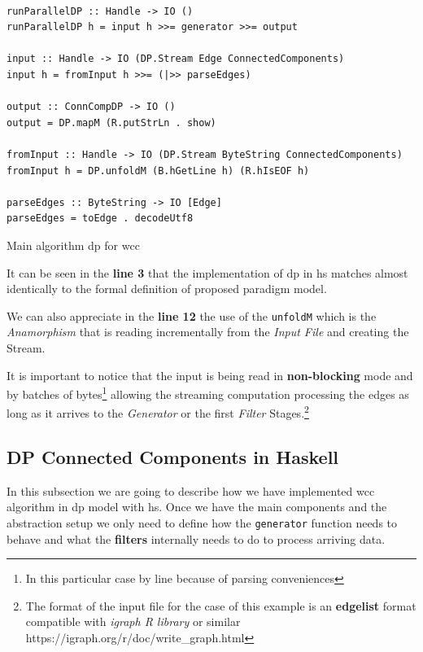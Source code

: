 \documentclass[preprint]{elsarticle}
\begin{document}
\begin{listing}[H]
\begin{verbatim}

runParallelDP :: Handle -> IO ()
runParallelDP h = input h >>= generator >>= output

input :: Handle -> IO (DP.Stream Edge ConnectedComponents)
input h = fromInput h >>= (|>> parseEdges)

output :: ConnCompDP -> IO ()
output = DP.mapM (R.putStrLn . show)

fromInput :: Handle -> IO (DP.Stream ByteString ConnectedComponents)
fromInput h = DP.unfoldM (B.hGetLine h) (R.hIsEOF h)

parseEdges :: ByteString -> IO [Edge]
parseEdges = toEdge . decodeUtf8

\end{verbatim}
\caption{Main algorithm \acrshort{dp} for \acrshort{wcc}}
\label{src:haskell:1}
\end{listing}

It can be seen in the \textbf{line 3} that the implementation of \acrshort{dp} in \acrshort{hs} matches almost identically to the formal definition of proposed paradigm model.

We can also appreciate in the \textbf{line 12} the use of the \texttt{unfoldM} which is the \emph{Anamorphism} that is reading incrementally from the \emph{Input File} and creating the Stream.

It is important to notice that the input is being read in \textbf{non-blocking} mode and by batches of bytes\footnote{In this particular case by line because of parsing conveniences} allowing the streaming computation processing the edges as long as it arrives to the \textit{Generator} or the first \textit{Filter} Stages.\footnote{The format of the input file for the case of this example is an \textbf{edgelist} format compatible with \emph{igraph R library} or similar https://igraph.org/r/doc/write\_graph.html}

\subsection{DP Connected Components in Haskell}
In this subsection we are going to describe how we have implemented \acrshort{wcc} algorithm in \acrshort{dp} model with \acrshort{hs}. Once we have the main components and the abstraction setup we only need to define how the \texttt{generator} function needs to behave and what the \textbf{filters} internally needs to do to process arriving data. 
\end{document}
